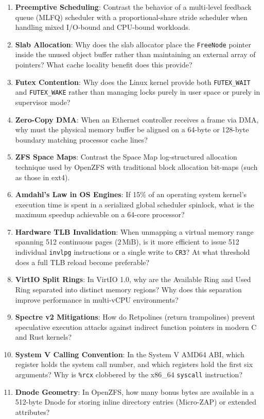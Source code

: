 \begin{enumerate}
    \item \textbf{Preemptive Scheduling}: Contrast the behavior of a multi-level feedback queue (MLFQ) scheduler with a proportional-share stride scheduler when handling mixed I/O-bound and CPU-bound workloads.
    \item \textbf{Slab Allocation}: Why does the slab allocator place the \texttt{FreeNode} pointer inside the unused object buffer rather than maintaining an external array of pointers? What cache locality benefit does this provide?
    \item \textbf{Futex Contention}: Why does the Linux kernel provide both \texttt{FUTEX\_WAIT} and \texttt{FUTEX\_WAKE} rather than managing locks purely in user space or purely in supervisor mode?
    \item \textbf{Zero-Copy DMA}: When an Ethernet controller receives a frame via DMA, why must the physical memory buffer be aligned on a 64-byte or 128-byte boundary matching processor cache lines?
    \item \textbf{ZFS Space Maps}: Contrast the Space Map log-structured allocation technique used by OpenZFS with traditional block allocation bit-maps (such as those in ext4).
    \item \textbf{Amdahl's Law in OS Engines}: If 15\% of an operating system kernel's execution time is spent in a serialized global scheduler spinlock, what is the maximum speedup achievable on a 64-core processor?
    \item \textbf{Hardware TLB Invalidation}: When unmapping a virtual memory range spanning 512 continuous pages ($2\,\text{MiB}$), is it more efficient to issue 512 individual \texttt{invlpg} instructions or a single write to \texttt{CR3}? At what threshold does a full TLB reload become preferable?
    \item \textbf{VirtIO Split Rings}: In VirtIO 1.0, why are the Available Ring and Used Ring separated into distinct memory regions? Why does this separation improve performance in multi-vCPU environments?
    \item \textbf{Spectre v2 Mitigations}: How do Retpolines (return trampolines) prevent speculative execution attacks against indirect function pointers in modern C and Rust kernels?
    \item \textbf{System V Calling Convention}: In the System V AMD64 ABI, which register holds the system call number, and which registers hold the first six arguments? Why is \texttt{\%rcx} clobbered by the x86\_64 \texttt{syscall} instruction?
    \item \textbf{Dnode Geometry}: In OpenZFS, how many bonus bytes are available in a 512-byte Dnode for storing inline directory entries (Micro-ZAP) or extended attributes?

\end{enumerate}
